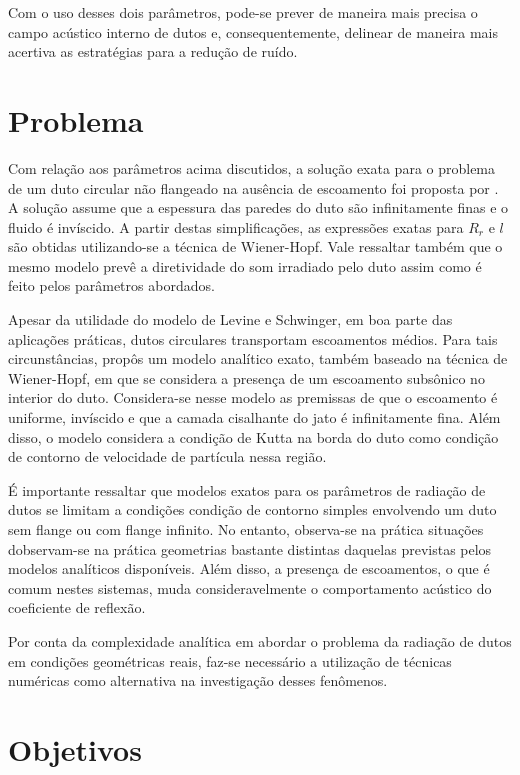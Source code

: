Com o uso desses dois parâmetros, pode-se prever de maneira mais precisa o campo acústico interno de dutos e, consequentemente, delinear de maneira mais acertiva as estratégias para a redução de ruído.

\section{Problema}

Com relação aos parâmetros acima discutidos, a solução exata para o problema de um duto circular não flangeado na ausência de escoamento foi proposta por . A solução assume que a espessura das paredes do duto são infinitamente finas e o fluido é invíscido. A partir destas simplificações, as expressões exatas para $R_{r}$ e $l$ são obtidas utilizando-se a técnica de Wiener-Hopf. Vale ressaltar também que o mesmo modelo prevê a diretividade do som irradiado pelo duto assim como é feito pelos parâmetros abordados.

Apesar da utilidade do modelo de Levine e Schwinger, em boa parte das aplicações práticas, dutos circulares transportam escoamentos médios. Para tais circunstâncias,  propôs um modelo analítico exato, também baseado na técnica de Wiener-Hopf, em que se considera a presença de um escoamento subsônico no interior do duto. Considera-se nesse modelo as premissas de que o escoamento é uniforme, invíscido e que a camada cisalhante do jato é infinitamente fina. Além disso, o modelo considera a condição de Kutta na borda do duto como condição de contorno de velocidade de partícula nessa região.

É importante ressaltar que modelos exatos para os parâmetros de radiação de dutos se limitam a condições condição de contorno simples envolvendo um duto sem flange ou com flange infinito. No entanto, observa-se na prática situações dobservam-se na prática geometrias bastante distintas daquelas previstas pelos modelos analíticos disponíveis. Além disso, a presença de escoamentos, o que é comum nestes sistemas, muda consideravelmente o comportamento acústico do coeficiente de reflexão.

Por conta da complexidade analítica em abordar o problema da radiação de dutos em condições geométricas reais, faz-se necessário a utilização de técnicas numéricas como alternativa na investigação desses fenômenos.


\section{Objetivos}

